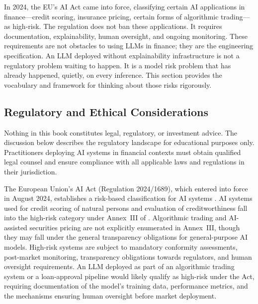 \begin{context}

In 2024, the EU's AI Act came into force, classifying certain AI applications in
finance---credit scoring, insurance pricing, certain forms of algo\-rithmic
trading---as high-risk.  The regulation does not ban these applications.  It
requires documentation, explainability, human oversight, and ongoing monitoring.
These requirements are not obstacles to using LLMs in finance; they are the
engineering specification.  An LLM deployed without explainability
infrastructure is not a regulatory problem waiting to happen.  It is a model
risk problem that has already happened, quietly, on every inference.  This
section provides the vocabulary and framework for thinking about those risks
rigorously.

\subsection{Regulatory and Ethical Considerations}
\label{sec:limitations-ethics}

\begin{remark}
Nothing in this book constitutes legal, regulatory, or investment advice.  The
discussion below describes the regulatory landscape for educational purposes only.
Practitioners deploying AI systems in financial contexts must obtain qualified legal
counsel and ensure compliance with all applicable laws and regulations in their
jurisdiction.
\end{remark}

The European Union's AI Act (Regulation 2024/1689), which entered into force in
August 2024, establishes a risk-based classification for AI systems \citep{euaiact2024}.
AI systems used for credit scoring of natural persons and evaluation of creditworthiness fall into the high-risk category under Annex~III of \citet{euaiact2024}. Algorithmic trading and AI-assisted securities pricing are not explicitly enumerated in Annex~III, though they may fall under the general transparency obligations for general-purpose AI models.  High-risk systems are subject to mandatory conformity
assessments, post-market monitoring, transparency obligations towards regulators, and
human oversight requirements.  An LLM deployed as part of an algorithmic trading
system or a loan-approval pipeline would likely qualify as high-risk under the Act,
requiring documentation of the model's training data, performance metrics, and the
mechanisms ensuring human oversight before market deployment.


\end{context}
